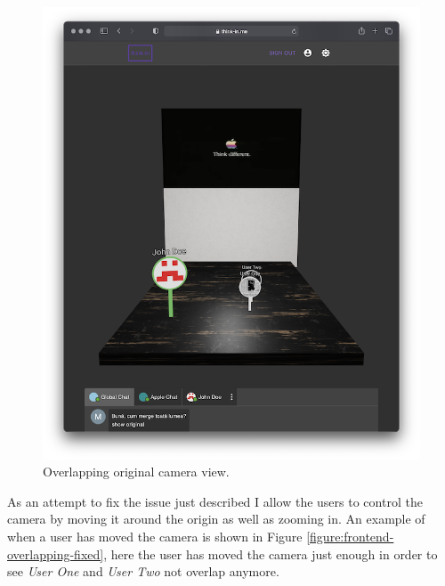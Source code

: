 \begin{figure}[H]
	\centering
	\includegraphics[width=\textwidth,keepaspectratio]{images/frontend/overlapping-non-fixed.png}
	\caption{Overlapping original camera view.}
	\label{figure:frontend-overlapping-non-fixed}
\end{figure}

As an attempt to fix the issue just described I allow the users to control the camera by moving it around the origin as well as zooming in. An example of when a user has moved the camera is shown in Figure \ref{figure:frontend-overlapping-fixed}, here the user has moved the camera just enough in order to see \textit{User One} and \textit{User Two} not overlap anymore.

